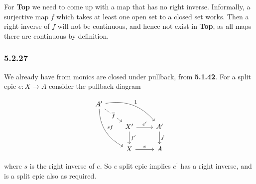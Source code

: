 \documentclass{article}
\begin{document}
For \textbf{Top} we need to come up with a map that has no right inverse. Informally, a surjective map $f$ which takes at least one open set to a closed set works. Then a right inverse of $f$ will not be continuous, and hence not exist in \textbf{Top}, as all maps there are continuous by definition.

\subsubsection*{5.2.27}

We already have from monics are closed under pullback, from \textbf{5.1.42}. For a split epic $e\colon X \rightarrow A$ consider the pullback diagram

\begin{equation*}
\begin{tikzcd}
A^\prime
\arrow[drr, bend left, "1"]
\arrow[ddr, bend right, "sf"]
\arrow[dr, dashed, "\overline{f}" description] & \\
& X^\prime \arrow[r, "e^\prime"] \arrow[d, "f^\prime"]
& A^\prime \arrow[d,"f"] \\
& X \arrow[r, "e"]
& A
\end{tikzcd}
\end{equation*}

where $s$ is the right inverse of $e$. So $e$ split epic implies $e^\prime$ has a right inverse, and is a split epic also as required.
\end{document}
